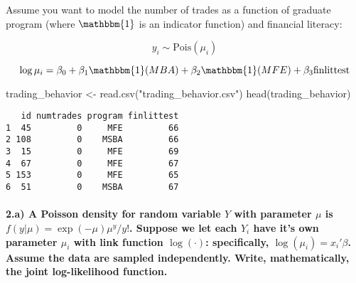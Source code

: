 \documentclass[
  letterpaper,
  DIV=11,
  numbers=noendperiod]{scrartcl}
\let\oldparagraph\paragraph
\renewcommand{\paragraph}[1]{\oldparagraph{#1}\mbox{}}
\newenvironment{Shaded}{\begin{snugshade}}{\end{snugshade}}
\newcommand{\FunctionTok}[1]{\textcolor[rgb]{0.28,0.35,0.67}{#1}}
\newcommand{\NormalTok}[1]{\textcolor[rgb]{0.00,0.23,0.31}{#1}}
\newcommand{\OtherTok}[1]{\textcolor[rgb]{0.00,0.23,0.31}{#1}}
\newcommand{\StringTok}[1]{\textcolor[rgb]{0.13,0.47,0.30}{#1}}
\begin{document}
Assume you want to model the number of trades as a function of graduate
program (where \(\mathbbm{1}\) is an indicator function) and financial
literacy:

\[ y_i \sim \text{Pois}(\mu_i) \]

\[ \log \mu_i = \beta_0 + \beta_1\mathbbm{1}(MBA) + \beta_2\mathbbm{1}(MFE) + \beta_3 \text{finlittest} \]

\begin{Shaded}
\begin{Highlighting}[]
\NormalTok{trading\_behavior }\OtherTok{\textless{}{-}} \FunctionTok{read.csv}\NormalTok{(}\StringTok{"trading\_behavior.csv"}\NormalTok{)}
\FunctionTok{head}\NormalTok{(trading\_behavior)}
\end{Highlighting}
\end{Shaded}

\begin{verbatim}
   id numtrades program finlittest
1  45         0     MFE         66
2 108         0    MSBA         66
3  15         0     MFE         69
4  67         0     MFE         67
5 153         0     MFE         65
6  51         0    MSBA         67
\end{verbatim}

\hypertarget{a-a-poisson-density-for-random-variable-y-with-parameter-mu-is-fymu-exp-mumuyy.-suppose-we-let-each-y_i-have-its-own-parameter-mu_i-with-link-function-logcdot-specifically-logmu_i-x_ibeta.-assume-the-data-are-sampled-independently.-write-mathematically-the-joint-log-likelihood-function.}{%
\paragraph{\texorpdfstring{2.a) A Poisson density for random variable
\(Y\) with parameter \(\mu\) is \(f(y|\mu) = \exp(-\mu)\mu^y/y!\).
Suppose we let each \(Y_i\) have it's own parameter \(\mu_i\) with link
function \(\log(\cdot)\): specifically, \(\log(\mu_i) = x_i'\beta\).
Assume the data are sampled independently. Write, mathematically, the
joint log-likelihood
function.}{2.a) A Poisson density for random variable Y with parameter \textbackslash mu is f(y\textbar\textbackslash mu) = \textbackslash exp(-\textbackslash mu)\textbackslash mu\^{}y/y!. Suppose we let each Y\_i have it's own parameter \textbackslash mu\_i with link function \textbackslash log(\textbackslash cdot): specifically, \textbackslash log(\textbackslash mu\_i) = x\_i\textquotesingle\textbackslash beta. Assume the data are sampled independently. Write, mathematically, the joint log-likelihood function.}}\label{a-a-poisson-density-for-random-variable-y-with-parameter-mu-is-fymu-exp-mumuyy.-suppose-we-let-each-y_i-have-its-own-parameter-mu_i-with-link-function-logcdot-specifically-logmu_i-x_ibeta.-assume-the-data-are-sampled-independently.-write-mathematically-the-joint-log-likelihood-function.}}
\end{document}
